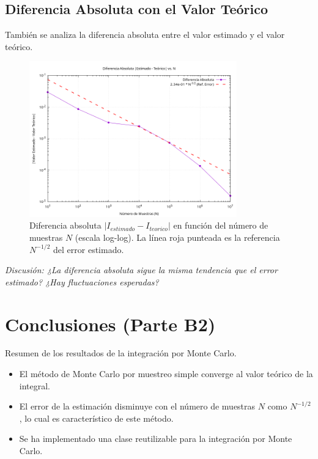 \documentclass[11pt,a4paper]{article}
\begin{document}
\subsection{Diferencia Absoluta con el Valor Teórico}
También se analiza la diferencia absoluta entre el valor estimado y el valor teórico.
\begin{figure}[h!]
    \centering
    \includegraphics[width=0.8\textwidth]{../results/integral_mc_exp_neg_x2_diff_abs_vs_N.png} %
    \caption{Diferencia absoluta $|I_{estimado} - I_{teorico}|$ en función del número de muestras $N$ (escala log-log). La línea roja punteada es la referencia $N^{-1/2}$ del error estimado.}
    \label{fig:integral_diff_abs}
\end{figure}
\textit{Discusión: ¿La diferencia absoluta sigue la misma tendencia que el error estimado? ¿Hay fluctuaciones esperadas?}

\section{Conclusiones (Parte B2)}
Resumen de los resultados de la integración por Monte Carlo.
\begin{itemize}
    \item El método de Monte Carlo por muestreo simple converge al valor teórico de la integral.
    \item El error de la estimación disminuye con el número de muestras $N$ como $N^{-1/2}$, lo cual es característico de este método.
    \item Se ha implementado una clase reutilizable para la integración por Monte Carlo.
\end{itemize}

% 
\end{document}
